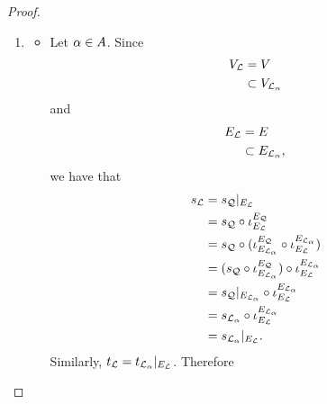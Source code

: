\documentclass{book}
\begin{document}
\begin{proof}
\begin{enumerate}
			and 
			\begin{align*}
				t_{\MQ}(E) 
				& = t_{\MQ} \bigg( \bigcap\limits_{\al \in A} E_{\ML_{\al}} \bigg) \\
				& \subset t_{\MQ}(E_{\ML_{\al_0}}) \\
				& \subset V_{\ML_{\al_0}}.
			\end{align*}
			Since $\al_0 \in A$ is arbitrary, we have that for each $\al \in A$, $s_{\MQ}(E) \subset V_{\ML_{\al}}$ and $t_{\MQ}(E) \subset V_{\ML_{\al}}$. Hence 
			\begin{align*}
				s_{\MQ}(E) 
				& \subset \bigcap\limits_{\al \in A} V_{\ML_{\al}} \\
				& = V
			\end{align*}
			and 
			\begin{align*}
				t_{\MQ}(E) 
				& \subset \bigcap\limits_{\al \in A} V_{\ML_{\al}} \\
				& = V.
			\end{align*}
			 then implies that $\ML \in \Subquiv(\MQ)$. 
			\item 
			\begin{itemize}
				\item Let $\al \in A$. Since  
				\begin{align*}
					V_{\mathcal{L}} 
					& = V \\
					& \subset V_{\mathcal{L}_{\alpha}}
				\end{align*}
				and 
				\begin{align*}
					E_{\mathcal{L}}
					& = E \\
					& \subset E_{\mathcal{L}_{\alpha}},
				\end{align*}
				we have that 
				\begin{align*}
					s_{\mathcal{L}}
					& = s_{\mathcal{Q}}|_{E_{\mathcal{L}}} \\
					& = s_{\mathcal{Q}} \circ \iota_{E_{\mathcal{L}}}^{E_{\mathcal{Q}}} \\
					& = s_{\mathcal{Q}} \circ (\iota_{E_{\mathcal{L}_{\alpha}}}^{E_{\mathcal{Q}}} \circ \iota_{E_{\mathcal{L}}}^{E_{\mathcal{L}_{\alpha}}}) \\
					& = (s_{\mathcal{Q}} \circ \iota_{E_{\mathcal{L}_{\alpha}}}^{E_{\mathcal{Q}}}) \circ \iota_{E_{\mathcal{L}}}^{E_{\mathcal{L}_{\alpha}}} \\
					& = s_{\mathcal{Q}}|_{E_{\mathcal{L}_{\alpha}}} \circ \iota_{E_{\mathcal{L}}}^{E_{\mathcal{L}_{\alpha}}} \\
					& = s_{\mathcal{L}_{\alpha}} \circ \iota_{E_{\mathcal{L}}}^{E_{\mathcal{L}_{\alpha}}} \\
					& = s_{\mathcal{L}_{\alpha}}|_{E_{\mathcal{L}}}.
				\end{align*}
				Similarly, $t_{\mathcal{L}} = t_{\mathcal{L}_{\alpha}}|_{E_{\mathcal{L}}}$. Therefore
				\begin{enumerate}

\end{enumerate}
\end{itemize}
\end{enumerate}
\end{proof}
\end{document}
